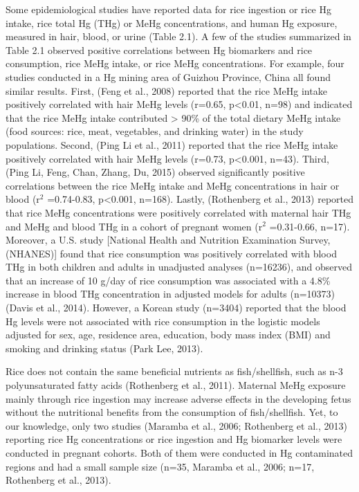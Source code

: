 Some epidemiological studies have reported data for rice ingestion or rice Hg intake, rice total Hg (THg) or MeHg concentrations, and human Hg exposure, measured in hair, blood, or urine (Table 2.1). A few of the studies summarized in Table 2.1 observed positive correlations between Hg biomarkers and rice consumption, rice MeHg intake, or rice MeHg concentrations. For example, four studies conducted in a Hg mining area of Guizhou Province, China all found similar results. First, (Feng et al., 2008) reported that the rice MeHg intake positively correlated with hair MeHg levels (r=0.65, p<0.01, n=98) and indicated that the rice MeHg intake contributed > 90\% of the total dietary MeHg intake (food sources: rice, meat, vegetables, and drinking water) in the study populations. Second, (Ping Li et al., 2011) reported that the rice MeHg intake positively correlated with hair MeHg levels (r=0.73, p<0.001, n=43). Third, (Ping Li, Feng, Chan, Zhang,  Du, 2015) observed significantly positive correlations between the rice MeHg intake and MeHg concentrations in hair or blood (\(\text{r}^{2}\) =0.74-0.83, p<0.001, n=168). Lastly, (Rothenberg et al., 2013) reported that rice MeHg concentrations were positively correlated with maternal hair THg and MeHg and blood THg in a cohort of pregnant women (\(\text{r}^{2}\) =0.31-0.66, n=17). Moreover, a U.S. study [National Health and Nutrition Examination Survey, (NHANES)] found that rice consumption was positively correlated with blood THg in both children and adults in unadjusted analyses (n=16236), and observed that an increase of 10 g/day of rice consumption was associated with a 4.8\% increase in blood THg concentration in adjusted models for adults (n=10373) (Davis et al., 2014). However, a Korean study (n=3404) reported that the blood Hg levels were not associated with rice consumption in the logistic models adjusted for sex, age, residence area, education, body mass index (BMI) and smoking and drinking status (Park Lee, 2013). 

Rice does not contain the same beneficial nutrients as fish/shellfish, such as n-3 polyunsaturated fatty acids (Rothenberg et al., 2011). Maternal MeHg exposure mainly through rice ingestion may increase adverse effects in the developing fetus without the nutritional benefits from the consumption of fish/shellfish. Yet, to our knowledge, only two studies (Maramba et al., 2006; Rothenberg et al., 2013) reporting rice Hg concentrations or rice ingestion and Hg biomarker levels were conducted in pregnant cohorts. Both of them were conducted in Hg contaminated regions and had a small sample size (n=35, Maramba et al., 2006; n=17, Rothenberg et al., 2013).

